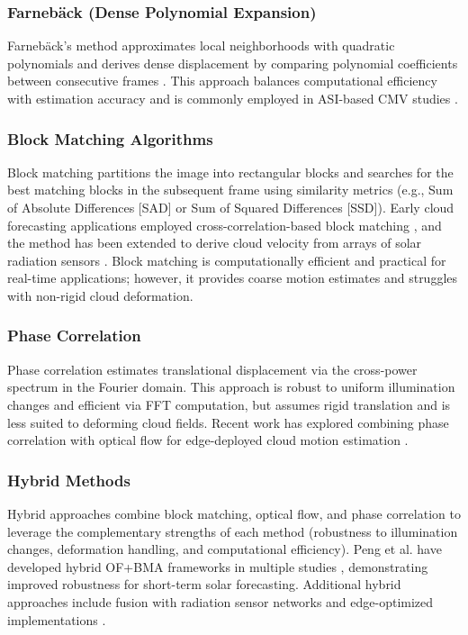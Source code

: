 \subsubsection*{Farneb\"ack (Dense Polynomial Expansion)}
Farneb\"ack's method approximates local neighborhoods with quadratic polynomials and derives dense displacement by comparing polynomial coefficients between consecutive frames \cite{farneback2003two}. This approach balances computational efficiency with estimation accuracy and is commonly employed in ASI-based CMV studies \cite{urquhart2016}.

\subsubsection{Block Matching Algorithms}
Block matching partitions the image into rectangular blocks and searches for the best matching blocks in the subsequent frame using similarity metrics (e.g., Sum of Absolute Differences [SAD] or Sum of Squared Differences [SSD]). Early cloud forecasting applications employed cross-correlation-based block matching \cite{hamill1993}, and the method has been extended to derive cloud velocity from arrays of solar radiation sensors \cite{bosch2013}. Block matching is computationally efficient and practical for real-time applications; however, it provides coarse motion estimates and struggles with non-rigid cloud deformation.

\subsubsection{Phase Correlation}
Phase correlation estimates translational displacement via the cross-power spectrum in the Fourier domain. This approach is robust to uniform illumination changes and efficient via FFT computation, but assumes rigid translation and is less suited to deforming cloud fields. Recent work has explored combining phase correlation with optical flow for edge-deployed cloud motion estimation \cite{raut2023}.

\subsubsection{Hybrid Methods}
Hybrid approaches combine block matching, optical flow, and phase correlation to leverage the complementary strengths of each method (robustness to illumination changes, deformation handling, and computational efficiency). Peng et al. have developed hybrid OF+BMA frameworks in multiple studies \cite{peng2016,peng2023hybrid}, demonstrating improved robustness for short-term solar forecasting. Additional hybrid approaches include fusion with radiation sensor networks \cite{rodriguezbenitez2021} and edge-optimized implementations \cite{raut2023}.

